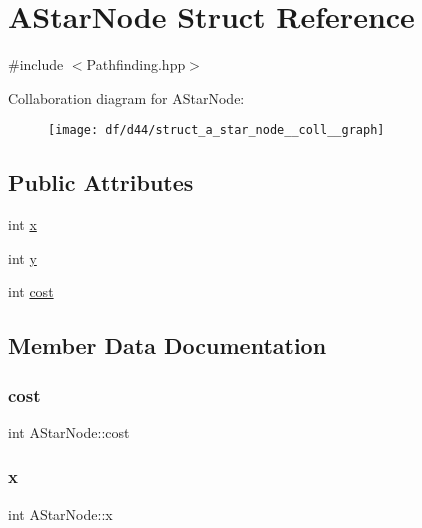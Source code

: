 \hypertarget{struct_a_star_node}{}\section{A\+Star\+Node Struct Reference}
\label{struct_a_star_node}


{\ttfamily \#include $<$Pathfinding.\+hpp$>$}



Collaboration diagram for A\+Star\+Node\+:\nopagebreak
\begin{figure}[H]
\begin{center}
\leavevmode
\texttt{[image: df/d44/struct\_a\_star\_node\_\_coll\_\_graph]}
\end{center}
\end{figure}
\subsection*{Public Attributes}
\begin{DoxyCompactItemize}
\item 
int \mbox{\hyperlink{struct_a_star_node_a7d4d80244c6ddf6733b70c87dca1a67e}{x}}
\item 
int \mbox{\hyperlink{struct_a_star_node_a9d583c923d4a73876a348299ec54f8c0}{y}}
\item 
int \mbox{\hyperlink{struct_a_star_node_a22e16074f58bbce0b40cb2b141fec3dc}{cost}}
\end{DoxyCompactItemize}


\subsection{Member Data Documentation}
\mbox{\label{struct_a_star_node_a22e16074f58bbce0b40cb2b141fec3dc}} 
\subsubsection{\texorpdfstring{cost}{cost}}
{\footnotesize\ttfamily int A\+Star\+Node\+::cost}

\mbox{\label{struct_a_star_node_a7d4d80244c6ddf6733b70c87dca1a67e}} 
\subsubsection{\texorpdfstring{x}{x}}
{\footnotesize\ttfamily int A\+Star\+Node\+::x}

